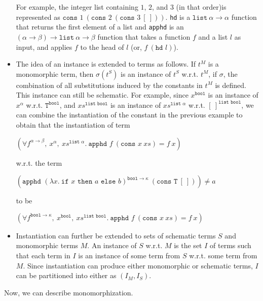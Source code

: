 \documentclass{article}
\begin{document}
\begin{itemize}
			For example, the integer list 
			containing $1$, $2$, and $3$ (in that 
			order)is represented as 
			$\texttt{cons }1\ (\texttt{cons }2
			\ (\texttt{cons }3\ [\ ]))$.
			\texttt{hd} is a $\texttt{list}\ 
			\alpha \to \alpha$ function that 
			returns the first element of a list 
			and \texttt{apphd} is an $(\alpha
			\to \beta) \to \texttt{list}\
			\alpha \to \beta$ function that
			takes a function $f$ and a list 
			$l$ as input, and applies $f$
			to the head of $l$ (or, $f\ 
			(\texttt{hd }l)$).
		\item The idea of an instance is 
			extended to terms as follows. If 
			$t^M$ is a monomorphic term, then 
			$\sigma(t^S)$ is an instance of 
			$t^S$ w.r.t. $t^M$, if 
			$\sigma$, the combination of all 
			substitutions induced by the 
			constants in $t^M$ is defined. This 
			instance can still be schematic. For 
			example, since $x^{\texttt{bool}}$ is 
			an instance of $x^{\alpha}$ w.r.t.
			$\texttt{T}^{\texttt{bool}}$, 
			and $xs^{\texttt{list bool}}$ is 
			an instance of 
			$xs^{\texttt{list }\alpha}$ 
			w.r.t. $[\ ]^{\texttt{list bool}}$,
			we can combine the instantiation 
			of the constant in the previous 
			example to obtain that the 
			instantiation of term
			\begin{center}
				$(\forall f^{\alpha \to \beta},\ 
				x^{\alpha},\ xs^{\texttt{list }
				\alpha}.\ \texttt{apphd }f\ 
				(\texttt{cons }x\ xs) = f\ x)$
			\end{center}
			w.r.t. the term
			\begin{center}
				$(\texttt{apphd }(\lambda 
				x.\ \texttt{if }x\texttt{ then }
				a \texttt{ else } b)^{\texttt{bool} 
				\to \kappa}\ (\texttt{cons T}\ 
				[\ ])) \neq a$
			\end{center}
			to be
			\begin{center}
				$(\forall f^{\texttt{bool}
				\to \kappa},\ x^{\texttt{bool}},
				\ xs^{\texttt{list bool}}.\ 
				\texttt{apphd }f\ (\texttt{cons }x
				\ xs) = f\ x)$
			\end{center}
		\item Instantiation can further be 
			extended to sets of schematic 
			terms $S$ and monomorphic terms $M$. 
			An instance of $S$ w.r.t. 
			$M$ is the set $I$ of terms such 
			that each term in $I$ is an instance 
			of some term from $S$ w.r.t. 
			some term from $M$. Since 
			instantiation can produce either 
			monomorphic or schematic terms, $I$
			can be partitioned into either as
			$(I_M, I_S)$.
		\end{itemize}
		Now, we can describe monomorphization.
\end{document}
